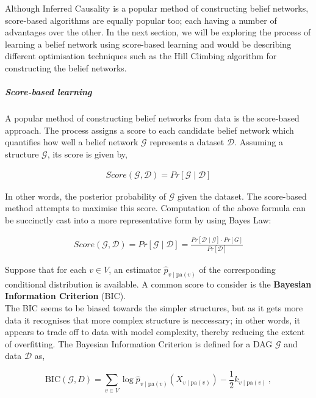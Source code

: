 Although Inferred Causality is a popular method of constructing belief networks, score-based algorithms are equally popular too; each having a number of advantages over the other. In the next section, we will be exploring the process of learning a belief network using score-based learning and would be describing different optimisation techniques such as the Hill Climbing algorithm for constructing the belief networks.

\subparagraph{Score-based learning}

\label{scorebased}

A popular method of constructing belief networks from data is the score-based approach\cite{koller2009probabilistic}. The process assigns a score to each candidate belief network which quantifies how well a belief network $\mathcal{G}$ represents a dataset $\mathcal{D}$. Assuming a structure $\mathcal{G}$, its score is given by,

\begin{align*}
Score(\mathcal{G}, \mathcal{D}) = Pr[\mathcal{G} \mid \mathcal{D}]
\end{align*}

In other words, the posterior probability of $\mathcal{G}$ given the dataset. The score-based method attempts to maximise this score. Computation of the above formula can be succinctly cast into a more representative form by using Bayes Law:


\begin{align*}
Score(\mathcal{G}, \mathcal{D}) = Pr[\mathcal{G} \mid \mathcal{D}] = \frac{Pr[\mathcal{D} \mid \mathcal{G}] \cdot Pr[G]}{Pr[\mathcal{D}]}
\end{align*}

Suppose that for each $v \in V$, an estimator $\hat p_{v\mid \text{pa}(v)}$ of the corresponding conditional distribution is available. A common score to consider is the \textbf{Bayesian Information Criterion} (BIC). \\

The BIC seems to be biased towards the simpler structures, but as it gets more data it recognises that more complex structure is neccessary; in other words, it appears to trade off to data with model complexity, thereby reducing the extent of overfitting. The Bayesian Information Criterion is defined \cite{carvalho2009scoring, kollerfriedman} for a DAG $\mathcal{G}$ and data $\mathcal{D}$ as,

\begin{equation*}
\text{BIC}(\mathcal G,D)=\sum_{v\in V}  \log \hat p_{v\mid \text{pa}(v)}\left(X_{v\mid \text{pa}(v)}\right) -\frac{1}{2} k_{v\mid \text{pa}(v)}\,,
\end{equation*}


